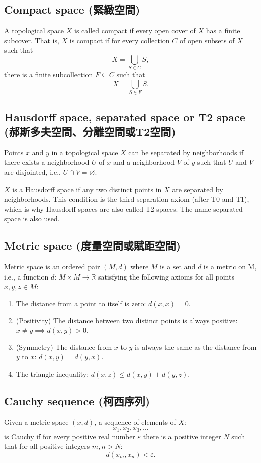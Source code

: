\documentclass[a4paper,12pt]{article}
\begin{document}
\subsection{Compact space (緊緻空間)}
A topological space $X$ is called compact if every open cover of $X$ has a finite subcover. That is, $X$ is compact if for every collection $C$ of open subsets of $X$ such that
\[X=\bigcup_{S\in C}S,\]
there is a finite subcollection $F\subseteq C$ such that
\[X=\bigcup _{S\in F}S.\]
\subsection{Hausdorff space, separated space or T2 space (郝斯多夫空間、分離空間或T2空間)}
Points $x$ and $y$ in a topological space $X$ can be separated by neighborhoods if there exists a neighborhood $U$ of $x$ and a neighborhood $V$ of $y$ such that $U$ and $V$ are disjointed, i.e., $U\cap V=\varnothing$.

$X$ is a Hausdorff space if any two distinct points in $X$ are separated by neighborhoods. This condition is the third separation axiom (after T0 and T1), which is why Hausdorff spaces are also called T2 spaces. The name separated space is also used.
\subsection{Metric space (度量空間或賦距空間)}
Metric space is an ordered pair $(M, d)$ where $M$ is a set and $d$ is a metric on M, i.e., a function $d:\,M\times M\to\mathbb{R}$ satisfying the following axioms for all points $x,y,z\in M$:
\begin{enumerate}
\item The distance from a point to itself is zero: $d(x,x)=0$.
\item (Positivity) The distance between two distinct points is always positive:$x\neq y\implies d(x,y)>0$.
\item (Symmetry) The distance from $x$ to $y$ is always the same as the distance from $y$ to $x$: $d(x,y)=d(y,x)$.
\item The triangle inequality: $d(x,z)\leq d(x,y)+d(y,z)$.
\end{enumerate}
\subsection{Cauchy sequence (柯西序列)}
Given a metric space $(x,d)$, a sequence of elements of $X$:
\[x_1,x_2,x_3,\ldots\]
is Cauchy if for every positive real number $\varepsilon$ there is a positive integer $N$ such that for all positive integers $m,n>N$:
\[d\left(x_m,x_n\right)<\varepsilon.\]
\end{document}
